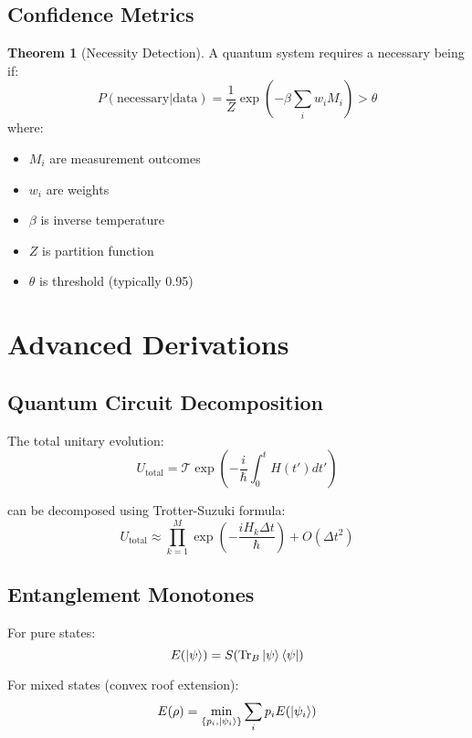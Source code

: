\documentclass[12pt]{article}
\theoremstyle{definition}
\newtheorem{theorem}{Theorem}[section]
\begin{document}
\subsection{Confidence Metrics}

\begin{theorem}[Necessity Detection]
A quantum system requires a necessary being if:
\begin{equation}
    P(\text{necessary}|\text{data}) = \frac{1}{Z}\exp\left(-\beta\sum_i w_iM_i\right) > \theta
\end{equation}
where:
\begin{itemize}
    \item $M_i$ are measurement outcomes
    \item $w_i$ are weights
    \item $\beta$ is inverse temperature
    \item $Z$ is partition function
    \item $\theta$ is threshold (typically 0.95)
\end{itemize}
\end{theorem}

\section{Advanced Derivations}

\subsection{Quantum Circuit Decomposition}
The total unitary evolution:
\begin{equation}
    U_{\text{total}} = \mathcal{T}\exp\left(-\frac{i}{\hbar}\int_0^t H(t')dt'\right)
\end{equation}

can be decomposed using Trotter-Suzuki formula:
\begin{equation}
    U_{\text{total}} \approx \prod_{k=1}^M \exp\left(-\frac{iH_k\Delta t}{\hbar}\right) + O(\Delta t^2)
\end{equation}

\subsection{Entanglement Monotones}
For pure states:
\begin{equation}
    E(\ket{\psi}) = S(\text{Tr}_B\ket{\psi}\bra{\psi})
\end{equation}

For mixed states (convex roof extension):
\begin{equation}
    E(\rho) = \min_{\{p_i,\ket{\psi_i}\}} \sum_i p_i E(\ket{\psi_i})
\end{equation}
\end{document}
